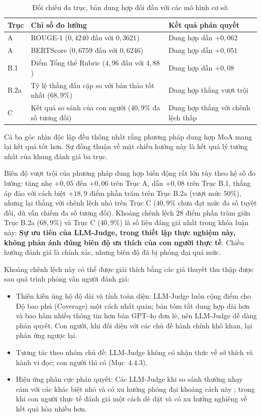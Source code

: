\begin{table}[H]
  \centering
  \caption{Đối chiếu đa trục, bản dung hợp đối đầu với các mô hình cơ sở.}
  \label{tab:cross-axis}
  \begin{tabularx}{\linewidth}{l X X}
    \toprule
    Trục & Chỉ số đo lường & Kết quả phán quyết \\
    \midrule
    A   & ROUGE-1 ($0{,}4240$ đấu với $0{,}3621$)   & Dung hợp dẫn $+0{,}062$ \\
    A   & BERTScore ($0{,}6759$ đấu với $0{,}6246$) & Dung hợp dẫn $+0{,}051$ \\
    B.1 & Điểm Tổng thể Rubric ($4{,}96$ đấu với $4{,}88$) & Dung hợp dẫn $+0{,}08$ \\
    B.2a & Tỷ lệ thắng đấu cặp so với bản thảo tốt nhất ($68,9\%$) & Dung hợp thắng vượt trội \\
    C   & Kết quả so sánh của con người ($40,9\%$ đa số tương đối) & Dung hợp thắng với chênh lệch thấp \\
    \bottomrule
  \end{tabularx}
\end{table}

Cả ba góc nhìn độc lập đều thống nhất rằng phương pháp dung hợp MoA mang lại kết quả tốt hơn. Sự đồng thuận về mặt chiều hướng này là kết quả lý tưởng nhất của khung đánh giá ba trục.

Biên độ vượt trội của phương pháp dung hợp biến động rất lớn tùy theo hệ số đo lường: tăng nhẹ $+0{,}05$ đến $+0{,}06$ trên Trục A, dẫn $+0{,}08$ trên Trục B.1, thắng áp đảo với cách biệt $+18{,}9$ điểm phần trăm trên Trục B.2a (vượt mức $50\%$), nhưng lại thắng với chênh lệch nhỏ trên Trục C ($40,9\%$ chưa đạt mức đa số tuyệt đối, dù vẫn chiếm đa số tương đối). Khoảng chênh lệch $28$ điểm phần trăm giữa Trục B.2a ($68,9\%$) và Trục C ($40,9\%$) là số liệu đáng giá nhất trong khóa luận này: \textbf{Sự ưu tiên của LLM-Judge, trong thiết lập thực nghiệm này, không phản ánh đúng biên độ ưa thích của con người thực tế}. Chiều hướng đánh giá là chính xác, nhưng biên độ đã bị phóng đại quá mức.

Khoảng chênh lệch này có thể được giải thích bằng các giả thuyết thu thập được sau quá trình phỏng vấn người đánh giá: 
\begin{itemize}
  \item Thiên kiến ủng hộ độ dài và tính toàn diện: LLM-Judge luôn cộng điểm cho Độ bao phủ (Coverage) một cách nhất quán; bản tóm tắt dung hợp dài hơn và bao hàm nhiều thông tin hơn bản GPT-4o đơn lẻ, nên LLM-Judge dễ dàng phán quyết. Con người, khi đối diện với các chủ đề hành chính khô khan, lại phản ứng ngược lại.
  \item Tương tác theo nhóm chủ đề: LLM-Judge không có nhận thức về sở thích và hành vi đọc; con người thì có (Mục~4.4.3).
  \item Hiệu ứng phân cực phán quyết:  Các LLM-Judge khi so sánh thường nhạy cảm với các khác biệt nhỏ và có xu hướng phóng đại khoảng cách này \cite{Zheng2023}; trong khi con người thực tế đánh giá một cách dè dặt và có xu hướng nghiêng về kết quả hòa nhiều hơn.
\end{itemize}

